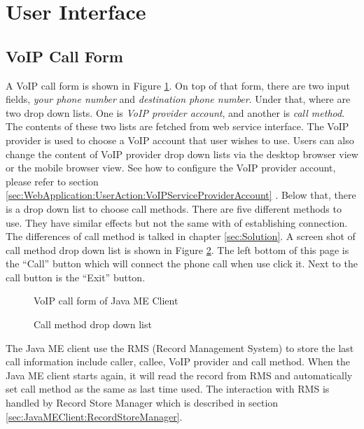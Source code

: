 \section{User Interface}
\label{sec:JavaMEClient:UserInterface}

\subsection{VoIP Call Form}
\label{sec:JavaMEClient:UserInterface:VoIPCallForm}

A VoIP call form is shown in Figure \ref{fig:VoIPCallFormOfJavaMEClient}. On top of that form, there are two input fields, \textit{your phone number} and \textit{destination phone number}. Under that, where are two drop down lists. One is \textit{VoIP provider account}, and another is \textit{call method}. The contents of these two lists are fetched from web service interface. The VoIP provider is used to choose a VoIP account that user wishes to use. Users can also change the content of VoIP provider drop down lists via the desktop browser view or the mobile browser view. See how to configure the VoIP provider account, please refer to section \ref{sec:WebApplication:UserAction:VoIPServiceProviderAccount} . Below that, there is a drop down list to choose call methods. There are five different methods to use. They have similar effects but not the same with of establishing connection. The differences of call method is talked in chapter \ref{sec:Solution}. A screen shot of call method drop down list is shown in Figure \ref{fig:CallMethodDropDownList}. The left bottom of this page is the ``Call'' button which will connect the phone call when use click it. Next to the call button is the ``Exit'' button.

\begin{figure}[!hbtp]
\centering
{}
\caption{VoIP call form of Java ME Client}
\label{fig:VoIPCallFormOfJavaMEClient}
\end{figure}

\begin{figure}[!hbtp]
\centering
{}
\caption{Call method drop down list}
\label{fig:CallMethodDropDownList}
\end{figure}

The Java ME client use the RMS (Record Management System) to store the last call information include caller, callee, VoIP provider and call method. When the Java ME client starts again, it will read the record from RMS and automatically set call method as the same as last time used. The interaction with RMS is handled by \textsf{Record Store Manager} which is described in section \ref{sec:JavaMEClient:RecordStoreManager}.

